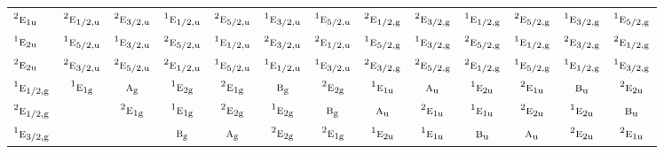 \documentclass[10pt,a4paper]{article}
\numberwithin{equation}{section}
\newcommand{\irr}[1]{\text{\normalfont\scshape #1}}
\newcommand{\conjpair}[1]{{}^{#1}}
\newcommand{\ptag}[1]{\mathrm{#1}}
\begin{document}
{\begin{longtable}{@{}lcccccccccccc@{}}
$\conjpair{2}\irr{e}_{1\ptag{u}}$ & $\conjpair{2}\irr{e}_{1/2,\ptag{u}}$ & $\conjpair{2}\irr{e}_{3/2,\ptag{u}}$ & $\conjpair{1}\irr{e}_{1/2,\ptag{u}}$ & $\conjpair{2}\irr{e}_{5/2,\ptag{u}}$ & $\conjpair{1}\irr{e}_{3/2,\ptag{u}}$ & $\conjpair{1}\irr{e}_{5/2,\ptag{u}}$ & $\conjpair{2}\irr{e}_{1/2,\ptag{g}}$ & $\conjpair{2}\irr{e}_{3/2,\ptag{g}}$ & $\conjpair{1}\irr{e}_{1/2,\ptag{g}}$ & $\conjpair{2}\irr{e}_{5/2,\ptag{g}}$ & $\conjpair{1}\irr{e}_{3/2,\ptag{g}}$ & $\conjpair{1}\irr{e}_{5/2,\ptag{g}}$\\
$\conjpair{1}\irr{e}_{2\ptag{u}}$ & $\conjpair{1}\irr{e}_{5/2,\ptag{u}}$ & $\conjpair{1}\irr{e}_{3/2,\ptag{u}}$ & $\conjpair{2}\irr{e}_{5/2,\ptag{u}}$ & $\conjpair{1}\irr{e}_{1/2,\ptag{u}}$ & $\conjpair{2}\irr{e}_{3/2,\ptag{u}}$ & $\conjpair{2}\irr{e}_{1/2,\ptag{u}}$ & $\conjpair{1}\irr{e}_{5/2,\ptag{g}}$ & $\conjpair{1}\irr{e}_{3/2,\ptag{g}}$ & $\conjpair{2}\irr{e}_{5/2,\ptag{g}}$ & $\conjpair{1}\irr{e}_{1/2,\ptag{g}}$ & $\conjpair{2}\irr{e}_{3/2,\ptag{g}}$ & $\conjpair{2}\irr{e}_{1/2,\ptag{g}}$\\
$\conjpair{2}\irr{e}_{2\ptag{u}}$ & $\conjpair{2}\irr{e}_{3/2,\ptag{u}}$ & $\conjpair{2}\irr{e}_{5/2,\ptag{u}}$ & $\conjpair{2}\irr{e}_{1/2,\ptag{u}}$ & $\conjpair{1}\irr{e}_{5/2,\ptag{u}}$ & $\conjpair{1}\irr{e}_{1/2,\ptag{u}}$ & $\conjpair{1}\irr{e}_{3/2,\ptag{u}}$ & $\conjpair{2}\irr{e}_{3/2,\ptag{g}}$ & $\conjpair{2}\irr{e}_{5/2,\ptag{g}}$ & $\conjpair{2}\irr{e}_{1/2,\ptag{g}}$ & $\conjpair{1}\irr{e}_{5/2,\ptag{g}}$ & $\conjpair{1}\irr{e}_{1/2,\ptag{g}}$ & $\conjpair{1}\irr{e}_{3/2,\ptag{g}}$\\
$\conjpair{1}\irr{e}_{1/2,\ptag{g}}$ & $\conjpair{1}\irr{e}_{1\ptag{g}}$ & $\irr{a}_{\ptag{g}}$ & $\conjpair{1}\irr{e}_{2\ptag{g}}$ & $\conjpair{2}\irr{e}_{1\ptag{g}}$ & $\irr{b}_{\ptag{g}}$ & $\conjpair{2}\irr{e}_{2\ptag{g}}$ & $\conjpair{1}\irr{e}_{1\ptag{u}}$ & $\irr{a}_{\ptag{u}}$ & $\conjpair{1}\irr{e}_{2\ptag{u}}$ & $\conjpair{2}\irr{e}_{1\ptag{u}}$ & $\irr{b}_{\ptag{u}}$ & $\conjpair{2}\irr{e}_{2\ptag{u}}$\\
$\conjpair{2}\irr{e}_{1/2,\ptag{g}}$ &  & $\conjpair{2}\irr{e}_{1\ptag{g}}$ & $\conjpair{1}\irr{e}_{1\ptag{g}}$ & $\conjpair{2}\irr{e}_{2\ptag{g}}$ & $\conjpair{1}\irr{e}_{2\ptag{g}}$ & $\irr{b}_{\ptag{g}}$ & $\irr{a}_{\ptag{u}}$ & $\conjpair{2}\irr{e}_{1\ptag{u}}$ & $\conjpair{1}\irr{e}_{1\ptag{u}}$ & $\conjpair{2}\irr{e}_{2\ptag{u}}$ & $\conjpair{1}\irr{e}_{2\ptag{u}}$ & $\irr{b}_{\ptag{u}}$\\
$\conjpair{1}\irr{e}_{3/2,\ptag{g}}$ &  &  & $\irr{b}_{\ptag{g}}$ & $\irr{a}_{\ptag{g}}$ & $\conjpair{2}\irr{e}_{2\ptag{g}}$ & $\conjpair{2}\irr{e}_{1\ptag{g}}$ & $\conjpair{1}\irr{e}_{2\ptag{u}}$ & $\conjpair{1}\irr{e}_{1\ptag{u}}$ & $\irr{b}_{\ptag{u}}$ & $\irr{a}_{\ptag{u}}$ & $\conjpair{2}\irr{e}_{2\ptag{u}}$ & $\conjpair{2}\irr{e}_{1\ptag{u}}$\\

\end{longtable}}
\end{document}
